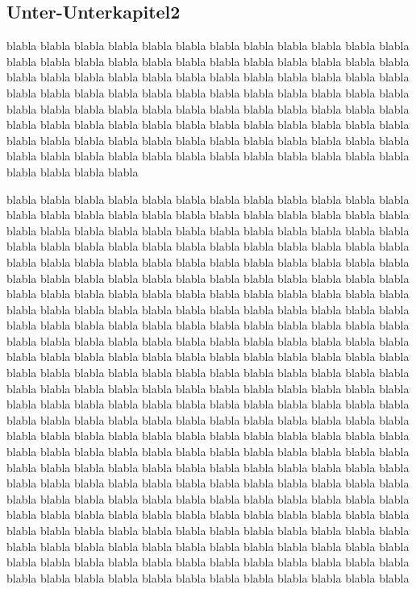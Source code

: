 \documentclass[12pt,a4paper,DIV13,pdftex,BCOR10mm,fleqn,liststotoc,bibtotoc,cleardoubleempty]{scrbook}
\begin{document}
\subsection{Unter-Unterkapitel2}
blabla blabla blabla blabla blabla blabla blabla blabla blabla blabla blabla blabla blabla blabla blabla blabla blabla blabla blabla blabla blabla blabla blabla blabla blabla blabla blabla blabla blabla blabla blabla blabla blabla blabla blabla blabla blabla blabla blabla blabla blabla blabla blabla blabla blabla blabla blabla blabla blabla blabla blabla blabla blabla blabla blabla blabla blabla blabla blabla blabla blabla blabla blabla blabla blabla blabla blabla blabla blabla blabla blabla blabla blabla blabla blabla blabla blabla blabla blabla blabla blabla blabla blabla blabla blabla blabla blabla blabla blabla blabla blabla blabla blabla blabla blabla blabla blabla blabla blabla blabla

blabla blabla blabla blabla blabla blabla blabla blabla blabla blabla blabla blabla blabla blabla blabla blabla blabla blabla blabla blabla blabla blabla blabla blabla blabla blabla blabla blabla blabla blabla blabla blabla blabla blabla blabla blabla blabla blabla blabla blabla blabla blabla blabla blabla blabla blabla blabla blabla blabla blabla blabla blabla blabla blabla blabla blabla blabla blabla blabla blabla blabla blabla blabla blabla blabla blabla blabla blabla blabla blabla blabla blabla blabla blabla blabla blabla blabla blabla blabla blabla blabla blabla blabla blabla blabla blabla blabla blabla blabla blabla blabla blabla blabla blabla blabla blabla blabla blabla blabla blabla
\newpage
blabla blabla blabla blabla blabla blabla blabla blabla blabla blabla blabla blabla blabla blabla blabla blabla blabla blabla blabla blabla blabla blabla blabla blabla blabla blabla blabla blabla blabla blabla blabla blabla blabla blabla blabla blabla blabla blabla blabla blabla blabla blabla blabla blabla blabla blabla blabla blabla blabla blabla blabla blabla blabla blabla blabla blabla blabla blabla blabla blabla blabla blabla blabla blabla blabla blabla blabla blabla blabla blabla blabla blabla blabla blabla blabla blabla blabla blabla blabla blabla blabla blabla blabla blabla blabla blabla blabla blabla blabla blabla blabla blabla blabla blabla blabla blabla blabla blabla blabla blabla blabla blabla blabla blabla blabla blabla blabla blabla blabla blabla blabla blabla blabla blabla blabla blabla blabla blabla blabla blabla blabla blabla blabla blabla blabla blabla blabla blabla blabla blabla blabla blabla blabla blabla blabla blabla blabla blabla blabla blabla blabla blabla blabla blabla blabla blabla blabla blabla blabla blabla blabla blabla blabla blabla blabla blabla blabla blabla blabla blabla blabla blabla blabla blabla blabla blabla blabla blabla blabla blabla blabla blabla blabla blabla blabla blabla blabla blabla blabla blabla blabla blabla blabla blabla blabla blabla blabla blabla blabla blabla blabla blabla blabla blabla blabla blabla blabla blabla blabla blabla
\end{document}
